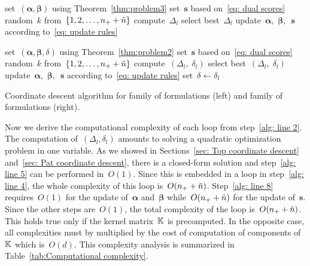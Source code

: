 \begin{algorithm*}[t]
  \begin{minipage}{0.50\textwidth}
    \centering
    \begin{algorithmic}[1]
      \State set~$(\bm{\alpha}, \bm{\beta})$ using Theorem~\ref{thm:problem3}
      \State set~$\bm{s}$ based on~\eqref{eq: dual scores} \label{alg: line 1}
      \Repeat \label{alg: line 2}
        \State random~$k$ from~$\{1, 2, \ldots, n_{+}+ \tilde{n} \}$ \label{alg: line 3}
         \label{alg: line 4}
            \State compute~$\Delta_{l}$  \label{alg: line 5}
        \EndFor
        \State select best~$\Delta_{l}$ \label{alg: line 7}
        \State update~$\bm{\alpha}$,~$\bm{\beta},$~$\bm{s}$ according to~\eqref{eq: update rules} \label{alg: line 8}
        \State \label{alg: line 9}
    \end{algorithmic}
  \end{minipage}
  \hfill
  \begin{minipage}{0.50\textwidth}
    \centering
    \begin{algorithmic}[1]
      \State set~$(\bm{\alpha}, \bm{\beta}, \delta)$ using Theorem~\ref{thm:problem2}
      \State set~$\bm{s}$ based on~\eqref{eq: dual scores}
      \Repeat
        \State random~$k$ from~$\{1, 2, \ldots, n_{+} + \tilde{n} \}$ 
            \State compute~$(\Delta_{l}, \; \delta_{l})$
        \EndFor
        \State select best~$(\Delta_{l}, \; \delta_{l})$
        \State update~$\bm{\alpha}$,~$\bm{\beta},$~$\bm{s}$ according to~\eqref{eq: update rules}
        \State set~$\delta \leftarrow \delta_{l}$
    \end{algorithmic}
  \end{minipage}
  \caption{Coordinate descent algorithm for \TopPushK family of formulations (left) and \PatMat  family of formulations (right).}
  \label{alg:Coordinate descent}
\end{algorithm*}

Now we derive the computational complexity of each \repeatloop loop from step~\ref{alg: line 2}. The computation of~$(\Delta_l,\delta_l)$ amounts to solving a quadratic optimization problem in one variable. As we showed in Sections~\ref{sec: Top coordinate descent} and~\ref{sec: Pat coordinate descent}, there is a closed-form solution and step~\ref{alg: line 5} can be performed in~$O(1)$. Since this is embedded in a \forloop loop in step~\ref{alg: line 4}, the whole complexity of this loop is~$O(n_{+} + \tilde{n})$. Step~\ref{alg: line 8} requires~$O(1)$ for the update of~$\bm{\alpha}$ and~$\bm{\beta}$ while~$O(n_{+} + \tilde{n})$ for the update of~$\bm{s}$. Since the other steps are~$O(1)$, the total complexity of the \repeatloop loop is~$O(n_{+} + \tilde{n})$. This holds true only if the kernel matrix~$\mathbb{K}$ is precomputed. In the opposite case, all complexities must by multiplied by the cost of computation of components of~$\mathbb{K}$ which is~$O(d)$. This complexity analysis is summarized in Table~\ref{tab:Computational complexity}. 

